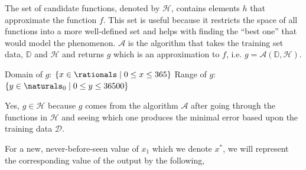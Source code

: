 \documentclass[12pt]{article}
\begin{document}
\begin{enumerate}
\begin{tcolorbox}[colback=white, sharp corners]

The set of candidate functions, denoted by $\mathcal{H}$, contains elements $h$ that approximate the function $f$. This set is useful because it restricts the space of all functions into a more well-defined set and helps with finding the ``best one'' that would model the phenomenon.
$\mathcal{A}$ is the algorithm that takes the training set data, $\mathbb{D}$ and $\mathcal{H}$ and returns $g$ which is an approximation to $f$, i.e. $g = \mathcal{A}\left(\mathbb{D}, \mathcal{H} \right)$.


\end{tcolorbox}


\begin{tcolorbox}[colback=white, sharp corners]

Domain of $g$: $\lbrace x \in \rationals \mid 0\leq x \leq 365 \rbrace $ \quad Range of $g$: $\lbrace y \in \naturals_0 \mid  0 \leq y \leq 36500 \rbrace$

\end{tcolorbox}


\begin{tcolorbox}[colback=white, sharp corners]

Yes, $g \in \mathcal{H}$ because $g$ comes from the algorithm $\mathcal{A}$ after going through the functions in $\mathcal{H}$ and seeing which one produces the minimal error based upon the training data $\mathcal{D}$.
\end{tcolorbox}


\begin{tcolorbox}[colback=white, sharp corners]

For a new, never-before-seen value of $x_1$ which we denote $x^{*}$, we will represent the corresponding value of the output by the following, 


\end{tcolorbox}
\end{enumerate}
\end{document}

